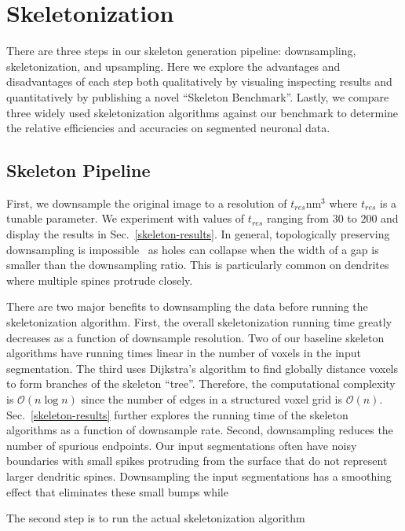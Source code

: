 \section{Skeletonization}

There are three steps in our skeleton generation pipeline: downsampling, skeletonization, and upsampling. 
Here we explore the advantages and disadvantages of each step both qualitatively by visualing inspecting results and quantitatively by publishing a novel ``Skeleton Benchmark''. 
Lastly, we compare three widely used skeletonization algorithms against our benchmark to determine the relative efficiencies and accuracies on segmented neuronal data.

\subsection{Skeleton Pipeline}

First, we downsample the original image to a resolution of $t_{res}\si{\nm^3}$ where $t_{res}$ is a tunable parameter. 
We experiment with values of $t_{res}$ ranging from $30$ to $200$ and display the results in Sec.~\ref{skeleton-results}.
In general, topologically preserving downsampling is impossible~\cite{kraus2001topology} as holes can collapse when the width of a gap is smaller than the downsampling ratio.
This is particularly common on dendrites where multiple spines protrude closely. 

There are two major benefits to downsampling the data before running the skeletonization algorithm.
First, the overall skeletonization running time greatly decreases as a function of downsample resolution.
Two of our baseline skeleton algorithms have running times linear in the number of voxels in the input segmentation.
The third uses Dijkstra's algorithm to find globally distance voxels to form branches of the skeleton ``tree''.
Therefore, the computational complexity is $\mathcal{O}(n \log{n})$ since the number of edges in a structured voxel grid is $\mathcal{O}(n)$.
Sec.~\ref{skeleton-results} further explores the running time of the skeleton algorithms as a function of downsample rate.
Second, downsampling reduces the number of spurious endpoints.
Our input segmentations often have noisy boundaries with small spikes protruding from the surface that do not represent larger dendritic spines.
Downsampling the input segmentations has a smoothing effect that eliminates these small bumps while 

The second step is to run the actual skeletonization algorithm 

